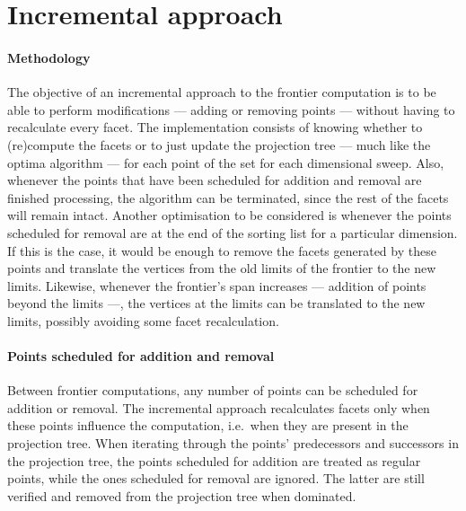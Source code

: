 \section{Incremental approach}

\paragraph{Methodology} The objective of an incremental approach to the frontier computation is to be able to perform modifications --- adding or removing points --- without having to recalculate every facet. The implementation consists of knowing whether to (re)compute the facets or to just update the projection tree --- much like the optima algorithm --- for each point of the set for each dimensional sweep. Also, whenever the points that have been scheduled for addition and removal are finished processing, the algorithm can be terminated, since the rest of the facets will remain intact.
Another optimisation to be considered is whenever the points scheduled for removal are at the end of the sorting list for a particular dimension. If this is the case, it would be enough to remove the facets generated by these points and translate the vertices from the old limits of the frontier to the new limits. Likewise, whenever the frontier's span increases --- addition of points beyond the limits ---, the vertices at the limits can be translated to the new limits, possibly avoiding some facet recalculation.

\paragraph{Points scheduled for addition and removal} Between frontier computations, any number of points can be scheduled for addition or removal. The incremental approach recalculates facets only when these points influence the computation, i.e.\ when they are present in the projection tree. When iterating through the points' predecessors and successors in the projection tree, the points scheduled for addition are treated as regular points, while the ones scheduled for removal are ignored. The latter are still verified and removed from the projection tree when dominated.

